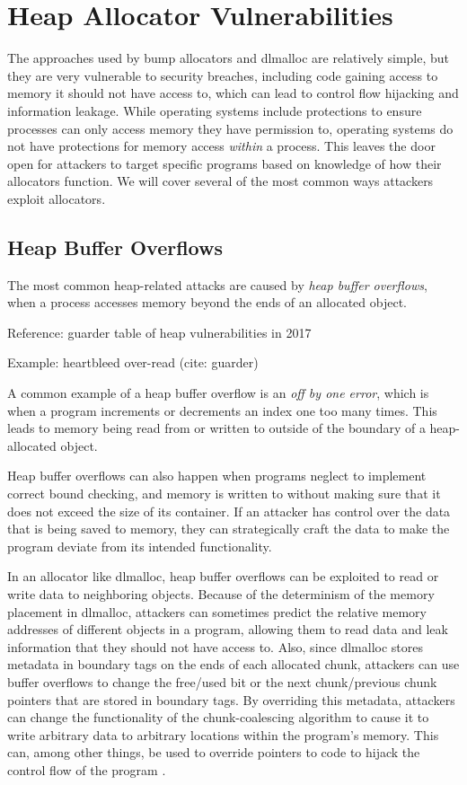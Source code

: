 \documentclass[conference]{IEEEtran}
\begin{document}
\section{Heap Allocator Vulnerabilities}

The approaches used by bump allocators and dlmalloc are relatively simple, but they are very vulnerable to security breaches, including code gaining access to memory it should not have access to, which can lead to control flow hijacking and information leakage.
While operating systems include protections to ensure processes can only access memory they have permission to, operating systems do not have protections for memory access \emph{within} a process.
This leaves the door open for attackers to target specific programs based on knowledge of how their allocators function.
We will cover several of the most common ways attackers exploit allocators.

\subsection{Heap Buffer Overflows}
The most common heap-related attacks are caused by \emph{heap buffer overflows}, when a process accesses memory beyond the ends of an allocated object.

	{\color{red} Reference: guarder table of heap vulnerabilities in 2017 }

	{\color{red} Example: heartbleed over-read (cite: guarder) }

A common example of a heap buffer overflow is an \emph{off by one error}, which is when a program increments or decrements an index one too many times.
This leads to memory being read from or written to outside of the boundary of a heap-allocated object.

Heap buffer overflows can also happen when programs neglect to implement correct bound checking, and memory is written to without making sure that it does not exceed the size of its container.
If an attacker has control over the data that is being saved to memory, they can strategically craft the data to make the program deviate from its intended functionality.

In an allocator like dlmalloc, heap buffer overflows can be exploited to read or write data to neighboring objects.
Because of the determinism of the memory placement in dlmalloc, attackers can sometimes predict the relative memory addresses of different objects in a program, allowing them to read data and leak information that they should not have access to.
Also, since dlmalloc stores metadata in boundary tags on the ends of each allocated chunk, attackers can use buffer overflows to change the free/used bit or the next chunk/previous chunk pointers that are stored in boundary tags.
By overriding this metadata, attackers can change the functionality of the chunk-coalescing algorithm to cause it to write arbitrary data to arbitrary locations within the program's memory.
This can, among other things, be used to override pointers to code to hijack the control flow of the program \cite{security_mem_cpp}.
\end{document}
